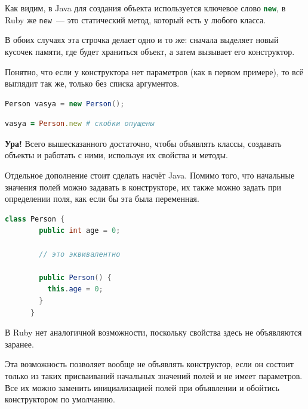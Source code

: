 \documentclass[a4paper, 14pt, titlepage]{extarticle}
\newcommand{\strong}[1]{\textbf{#1}}
\newenvironment{halfpage}%
    {\noindent\begin{minipage}[h]{0.49\linewidth}} %
    {\end{minipage}\hfill}
\newcommand{\inlinecode}[2][Java]{\lstinline[basicstyle=\ttfamily, language=#1]{#2}}
\begin{document}
  Как видим, в Java для создания объекта используется ключевое слово \inlinecode[Java]{new}, в Ruby
  же \inlinecode[Ruby]{new}~--- это статический метод, который есть у любого класса.

  В обоих случаях эта строчка делает одно и то же: сначала выделяет новый кусочек памяти, где будет
  храниться объект, а затем вызывает его конструктор.

  Понятно, что если у конструктора нет параметров (как в первом примере), то всё выглядит так же,
  только без списка аргументов.

  \begin{halfpage}
    \begin{lstlisting}[language=Java, title={Создание объекта в Java}, gobble=6, texcl]
      Person vasya = new Person();
    \end{lstlisting}
  \end{halfpage}
  \begin{halfpage}
    \begin{lstlisting}[language=Ruby, title={Создание объекта в Ruby}, gobble=6, texcl]
      vasya = Person.new # скобки опущены
    \end{lstlisting}
  \end{halfpage}

  \vspace{1cm}

  \strong{Ура!} Всего вышесказанного достаточно, чтобы объявлять классы, создавать объекты и
  работать с ними, используя их свойства и методы.

  \begin{center}
    \begin{halfpage}
      \hrulefill
    \end{halfpage}
  \end{center}

  Отдельное дополнение стоит сделать насчёт Java. Помимо того, что начальные значения полей можно
  задавать в конструкторе, их также можно задать при определении поля, как если бы эта была
  переменная.

  \begin{halfpage}
    \begin{lstlisting}[language=Java, title={Инициализация поля в Java}, gobble=6, texcl]
      class Person {
        public int age = 0;

        // это эквивалентно

        public Person() {
          this.age = 0;
        }
      }
    \end{lstlisting}
  \end{halfpage}
  \begin{halfpage}
    В Ruby нет аналогичной возможности, поскольку свойства здесь не объявляются заранее.
  \end{halfpage}

  Эта возможность позволяет вообще не объявлять конструктор, если он состоит только из
  таких присваиваний начальных значений полей и не имеет параметров. Все их можно заменить
  инициализацией полей при объявлении и обойтись конструктором по умолчанию.

\end{document}
